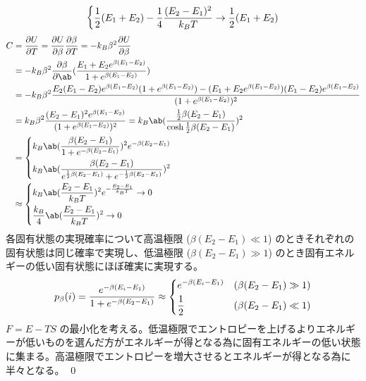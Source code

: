 \documentclass[uplatex,diffipdfmx,a4paper,11pt]{jlreq}
\makeatletter
\theoremstyle{definition}
\renewenvironment{proof}[1][\proofname]{\par
  \normalfont
  \topsep6\p@\@plus6\p@ \trivlist
  \item[\hskip\labelsep{\bfseries #1}\@addpunct{\bfseries}]\ignorespaces\quad\par
}{%
  \qed\endtrivlist\@endpefalse
}
\renewcommand\proofname{証明}
\makeatother
\begin{document}
\begin{proof}
\begin{align}
\begin{dcases}
                  \frac{1}{2}(E_1 + E_2) - \frac{1}{4}\frac{(E_2 - E_1)^2}{k_BT} \to \frac{1}{2}(E_1 + E_2) \\
                \end{dcases}
  \end{align}
  \begin{align}
    C & = \diffp{U}{T} = \diffp{U}{\beta}\diffp{\beta}{T} = -k_B\beta^2\diffp{U}{\beta}                                                                                                 \\
      & = -k_B\beta^2\diffp{\beta}\ab(\frac{E_1 + E_2e^{\beta(E_1 - E_2)}}{1 + e^{\beta(E_1 - E_2)}})                                                                                   \\
      & = -k_B\beta^2\frac{E_2(E_1 - E_2)e^{\beta(E_1 - E_2)}(1 + e^{\beta(E_1 - E_2)}) - (E_1 + E_2e^{\beta(E_1 - E_2)})(E_1 - E_2)e^{\beta(E_1 - E_2)}}{(1 + e^{\beta(E_1 - E_2)})^2} \\
      & = k_B\beta^2\frac{(E_2 - E_1)^2e^{\beta(E_1 - E_2)}}{(1 + e^{\beta(E_1 - E_2)})^2} = k_B\ab(\frac{\frac{1}{2}\beta(E_2 - E_1)}{\cosh\frac{1}{2}\beta(E_2 - E_1)})^2             \\
      & = \begin{dcases}
            k_B\ab(\frac{\beta(E_2 - E_1)}{1 + e^{-\beta(E_2 - E_1)}})^2e^{-\beta(E_2 - E_1)} \\
            k_B\ab(\frac{\beta(E_2 - E_1)}{e^{\frac{1}{2}\beta(E_2 - E_1)} + e^{-\frac{1}{2}\beta(E_2 - E_1)}})^2
          \end{dcases}                                                          \\
      & \approx \begin{dcases}
                  k_B\ab(\frac{E_2 - E_1}{k_BT})^2e^{-\frac{E_2 - E_1}{k_BT}} \to 0 \\
                  \frac{k_B}{4}\ab(\frac{E_2 - E_1}{k_BT})^2 \to 0
                \end{dcases}
  \end{align}
  各固有状態の実現確率について高温極限 ($\beta(E_2 - E_1) \ll 1$) のときそれぞれの固有状態は同じ確率で実現し、低温極限 ($\beta(E_2 - E_1) \gg 1$) のとき固有エネルギーの低い固有状態にほぼ確実に実現する。
  \begin{align}
    \quad p_\beta(i) & = \frac{e^{-\beta (E_i - E_1)}}{1 + e^{-\beta(E_2 - E_1)}} \approx \begin{dcases}
                                                                                            e^{-\beta (E_i - E_1)} & (\beta(E_2 - E_1) \gg 1) \\
                                                                                            \frac{1}{2}            & (\beta(E_2 - E_1) \ll 1)
                                                                                          \end{dcases}
  \end{align}
  $F = E - TS$ の最小化を考える。低温極限でエントロピーを上げるよりエネルギーが低いものを選んだ方がエネルギーが得となる為に固有エネルギーの低い状態に集まる。高温極限でエントロピーを増大させるとエネルギーが得となる為に半々となる。
\end{proof}
\end{document}
